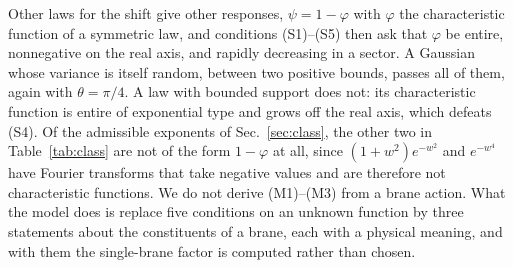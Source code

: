 \documentclass[aps,prd,10pt,twocolumn,superscriptaddress,nofootinbib,floatfix,longbibliography]{revtex4-2}
\begin{document}
Other laws for the shift give other responses, $\psi=1-\varphi$ with $\varphi$ the characteristic function of a symmetric law, and conditions (S1)--(S5) then ask that $\varphi$ be entire, nonnegative on the real axis, and rapidly decreasing in a sector. A Gaussian whose variance is itself random, between two positive bounds, passes all of them, again with $\theta=\pi/4$. A law with bounded support does not: its characteristic function is entire of exponential type and grows off the real axis, which defeats (S4). Of the admissible exponents of Sec.~\ref{sec:class}, the other two in Table~\ref{tab:class} are not of the form $1-\varphi$ at all, since $(1+w^2)e^{-w^2}$ and $e^{-w^4}$ have Fourier transforms that take negative values and are therefore not characteristic functions. We do not derive (M1)--(M3) from a brane action. What the model does is replace five conditions on an unknown function by three statements about the constituents of a brane, each with a physical meaning, and with them the single-brane factor is computed rather than chosen.
\end{document}
